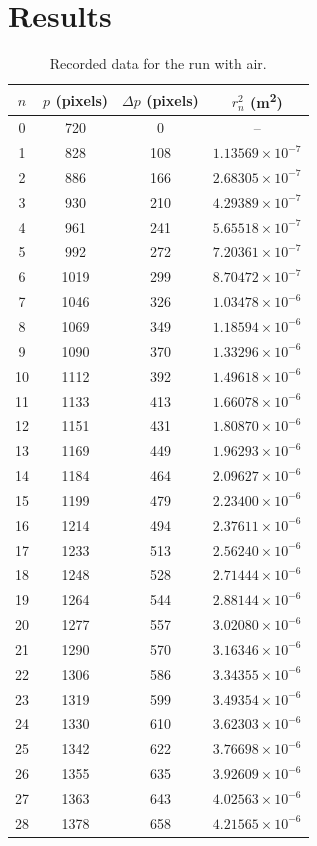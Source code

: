 \documentclass[12pt,a4paper]{article}
\begin{document}
\newpage

\section{Results}

\begin{table}[H]
    \centering
    \caption{Recorded data for the run with air.}
    \label{tab:air}
    \small
    \begin{tabular}{cccc}
    \toprule
    $n$ & $p$ (pixels) & $\Delta p$ (pixels)
    & $r_n^2$ (\si{m^2})\\
    \midrule
    0  & 720  & 0   & --\\
    1  & 828  & 108 & $1.13569\times10^{-7}$\\
    2  & 886  & 166 & $2.68305\times10^{-7}$\\
    3  & 930  & 210 & $4.29389\times10^{-7}$\\
    4  & 961  & 241 & $5.65518\times10^{-7}$\\
    5  & 992  & 272 & $7.20361\times10^{-7}$\\
    6  & 1019 & 299 & $8.70472\times10^{-7}$\\
    7  & 1046 & 326 & $1.03478\times10^{-6}$\\
    8  & 1069 & 349 & $1.18594\times10^{-6}$\\
    9  & 1090 & 370 & $1.33296\times10^{-6}$\\
    10 & 1112 & 392 & $1.49618\times10^{-6}$\\
    11 & 1133 & 413 & $1.66078\times10^{-6}$\\
    12 & 1151 & 431 & $1.80870\times10^{-6}$\\
    13 & 1169 & 449 & $1.96293\times10^{-6}$\\
    14 & 1184 & 464 & $2.09627\times10^{-6}$\\
    15 & 1199 & 479 & $2.23400\times10^{-6}$\\
    16 & 1214 & 494 & $2.37611\times10^{-6}$\\
    17 & 1233 & 513 & $2.56240\times10^{-6}$\\
    18 & 1248 & 528 & $2.71444\times10^{-6}$\\
    19 & 1264 & 544 & $2.88144\times10^{-6}$\\
    20 & 1277 & 557 & $3.02080\times10^{-6}$\\
    21 & 1290 & 570 & $3.16346\times10^{-6}$\\
    22 & 1306 & 586 & $3.34355\times10^{-6}$\\
    23 & 1319 & 599 & $3.49354\times10^{-6}$\\
    24 & 1330 & 610 & $3.62303\times10^{-6}$\\
    25 & 1342 & 622 & $3.76698\times10^{-6}$\\
    26 & 1355 & 635 & $3.92609\times10^{-6}$\\
    27 & 1363 & 643 & $4.02563\times10^{-6}$\\
    28 & 1378 & 658 & $4.21565\times10^{-6}$\\
    \bottomrule
    \end{tabular}
\end{table}
\end{document}
